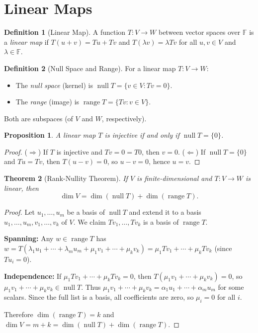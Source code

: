 \documentclass[11pt,a4paper]{article}
\theoremstyle{definition}
\newtheorem{definition}{Definition}[section]
\theoremstyle{plain}
\newtheorem{theorem}{Theorem}[section]
\newtheorem{proposition}[theorem]{Proposition}
\theoremstyle{remark}
\newcommand{\F}{\mathbb{F}}
\DeclareMathOperator{\range}{range}
\DeclareMathOperator{\nullspace}{null}
\begin{document}
\section{Linear Maps}
\label{sec:linear_maps}

\begin{definition}[Linear Map]
\label{def:linear_map}
A function $T: V \to W$ between vector spaces over $\F$ is a \emph{linear map} if
$T(u + v) = Tu + Tv$ and $T(\lambda v) = \lambda Tv$ for all $u, v \in V$ and $\lambda \in \F$.
\end{definition}

\begin{definition}[Null Space and Range]
\label{def:null_range}
For a linear map $T: V \to W$:
\begin{itemize}[nosep]
    \item The \emph{null space} (kernel) is $\nullspace T = \{v \in V : Tv = 0\}$.
    \item The \emph{range} (image) is $\range T = \{Tv : v \in V\}$.
\end{itemize}
Both are subspaces (of $V$ and $W$, respectively).
\end{definition}

\begin{proposition}
\label{prop:injectivity}
A linear map $T$ is injective if and only if $\nullspace T = \{0\}$.
\end{proposition}

\begin{proof}
($\Rightarrow$) If $T$ is injective and $Tv = 0 = T0$, then $v = 0$.
($\Leftarrow$) If $\nullspace T = \{0\}$ and $Tu = Tv$, then $T(u - v) = 0$,
so $u - v = 0$, hence $u = v$.
\end{proof}

\begin{theorem}[Rank-Nullity Theorem]
\label{thm:rank_nullity}
If $V$ is finite-dimensional and $T: V \to W$ is linear, then
\[
    \dim V = \dim(\nullspace T) + \dim(\range T).
\]
\end{theorem}

\begin{proof}
Let $u_1, \ldots, u_m$ be a basis of $\nullspace T$ and extend it to a basis
$u_1, \ldots, u_m, v_1, \ldots, v_k$ of $V$. We claim $Tv_1, \ldots, Tv_k$ is a basis of
$\range T$.

\textbf{Spanning:} Any $w \in \range T$ has $w = T(\lambda_1 u_1 + \cdots + \lambda_m u_m
+ \mu_1 v_1 + \cdots + \mu_k v_k) = \mu_1 Tv_1 + \cdots + \mu_k Tv_k$ (since $Tu_i = 0$).

\textbf{Independence:} If $\mu_1 Tv_1 + \cdots + \mu_k Tv_k = 0$, then
$T(\mu_1 v_1 + \cdots + \mu_k v_k) = 0$, so $\mu_1 v_1 + \cdots + \mu_k v_k \in \nullspace T$.
Thus $\mu_1 v_1 + \cdots + \mu_k v_k = \alpha_1 u_1 + \cdots + \alpha_m u_m$ for some scalars.
Since the full list is a basis, all coefficients are zero, so $\mu_i = 0$ for all $i$.

Therefore $\dim(\range T) = k$ and $\dim V = m + k = \dim(\nullspace T) + \dim(\range T)$.
\end{proof}
\end{document}

